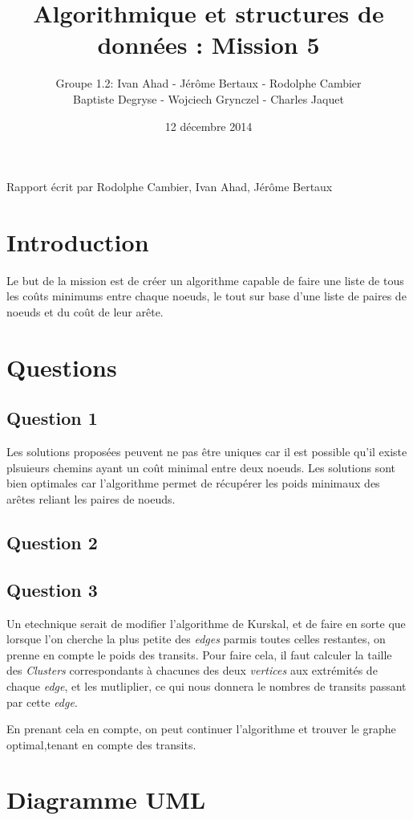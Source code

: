 \documentclass[a4paper]{article}
\title{Algorithmique et structures de données : Mission 5}
\date{12 décembre 2014}
\author{Groupe 1.2: Ivan Ahad - Jérôme Bertaux - Rodolphe Cambier \\ 
	Baptiste Degryse - Wojciech Grynczel - Charles Jaquet}
\begin{document}
\maketitle


Rapport écrit par Rodolphe Cambier, Ivan Ahad, Jérôme Bertaux
\section*{Introduction}
Le but de la mission est de créer un algorithme capable de faire une liste de tous les coûts minimums entre chaque noeuds, le tout sur base d'une liste de paires de noeuds et du coût de leur arête. 
\section*{Questions}

\subsection*{Question 1}
Les solutions proposées peuvent ne pas être uniques car il est possible qu'il existe plsuieurs chemins ayant un coût minimal entre deux noeuds. Les solutions sont bien optimales car l'algorithme permet de récupérer les poids minimaux des arêtes reliant les paires de noeuds. 
\subsection*{Question 2}

\subsection*{Question 3}

Un etechnique serait de modifier l'algorithme de Kurskal, et de faire en sorte que lorsque l'on cherche la plus petite des \textit{edges} parmis toutes celles restantes, on prenne en compte le poids des transits. Pour faire cela, il faut calculer la taille des \textit{Clusters} correspondants à chacunes des deux \textit{vertices} aux extrémités de chaque \textit{edge}, et les mutliplier, ce qui nous donnera le nombres de transits passant par cette \textit{edge}.

En prenant cela en compte, on peut continuer l'algorithme et trouver le graphe optimal,tenant en compte des transits.



\section*{Diagramme UML}
\end{document}
